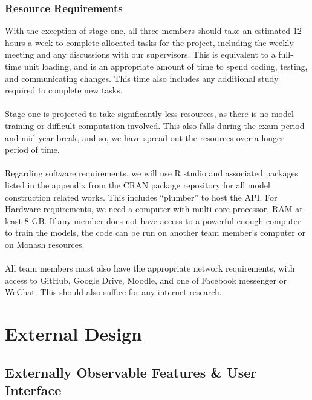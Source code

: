 \documentclass[a4paper, 12pt]{article}
\begin{document}
        \subsubsection{Resource Requirements}
        With the exception of stage one, all three members should take an estimated 12 hours a week to complete allocated tasks for the project, including the weekly meeting and any discussions with our supervisors. This is equivalent to a full-time unit loading, and is an appropriate amount of time to spend coding, testing, and communicating changes.
        This time also includes any additional study required to complete new tasks.
        \\\\
        Stage one is projected to take significantly less resources, as there is no model training or difficult computation involved. This also falls during the exam period and mid-year break, and so, we have spread out the resources over a longer period of time.
        \\\\
        Regarding software requirements, we will use R studio and associated packages listed in the appendix from the CRAN package repository for all model construction related works. This includes “plumber” to host the API. For Hardware requirements, we need a computer with multi-core processor, RAM at least 8 GB. If any member does not have access to a powerful enough computer to train the models, the code can be run on another team member's computer or on Monash resources.
        \\\\
        All team members must also have the appropriate network requirements, with access to GitHub, Google Drive, Moodle, and one of Facebook messenger or WeChat. This should also suffice for any internet research.
        
\section{External Design} \label{extdes}

   \subsection{Externally Observable Features \& User Interface}
\end{document}
